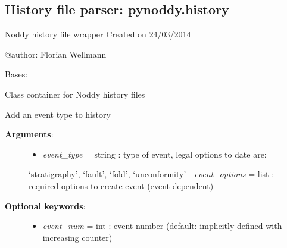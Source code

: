 \documentclass[a4paper,10pt,english]{sphinxmanual}
\begin{document}
\subsection{History file parser: pynoddy.history}
\label{pynoddy:module-pynoddy.history}\label{pynoddy:history-file-parser-pynoddy-history}
Noddy history file wrapper
Created on 24/03/2014

@author: Florian Wellmann

\begin{fulllineitems}
\label{pynoddy:pynoddy.history.NoddyHistory}
Bases: 

Class container for Noddy history files

\begin{fulllineitems}
\label{pynoddy:pynoddy.history.NoddyHistory.add_event}
Add an event type to history
\begin{description}
\item[{\textbf{Arguments}:}] \leavevmode\begin{itemize}
\item {} 
\emph{event\_type} = string : type of event, legal options to date are:

\end{itemize}

`stratigraphy', `fault', `fold', `unconformity'
- \emph{event\_options} = list : required options to create event (event dependent)

\item[{\textbf{Optional keywords}:}] \leavevmode\begin{itemize}
\item {} 
\emph{event\_num} = int : event number (default: implicitly defined with increasing counter)

\end{itemize}

\end{description}

\end{fulllineitems}



\end{fulllineitems}
\end{document}
